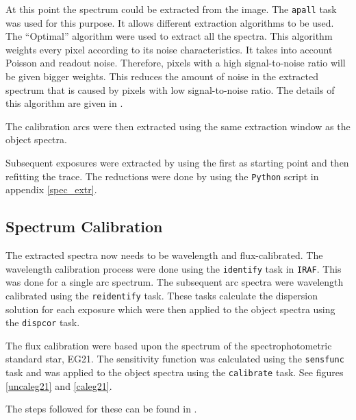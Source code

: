 At this point the spectrum could be extracted from the image. The \texttt{apall} task was used for this purpose. It allows different extraction algorithms to be used. The ``Optimal'' algorithm were used to extract all the spectra. This algorithm weights every pixel according to its noise characteristics. It takes into account Poisson and readout noise. Therefore, pixels with a high signal-to-noise ratio will be given bigger weights. This reduces the amount of noise in the extracted spectrum that is caused by pixels with low signal-to-noise ratio. The details of this algorithm are given in \cite{HorneOpt}.

The calibration arcs were then extracted using the same extraction window as the object spectra.

Subsequent exposures were extracted by using the first as starting point and then refitting the trace. The reductions were done by using the \texttt{Python} script in appendix \ref{spec_extr}.


\subsection{Spectrum Calibration}
\label{spec_cal}

The extracted spectra now needs to be wavelength and flux-calibrated. The wavelength calibration process were done using the \texttt{identify} task in \texttt{IRAF}. This was done for a single arc spectrum. The subsequent arc spectra were wavelength calibrated using the \texttt{reidentify} task. These tasks calculate the dispersion solution for each exposure which were then applied to the object spectra using the \texttt{dispcor} task.

The flux calibration were based upon the spectrum of the spectrophotometric standard star, EG21. The sensitivity function was calculated using the \texttt{sensfunc} task and was applied to the object spectra using the \texttt{calibrate} task. See figures \ref{uncaleg21} and \ref{caleg21}.

The steps followed for these can be found in \cite{slitspecIRAF}.



